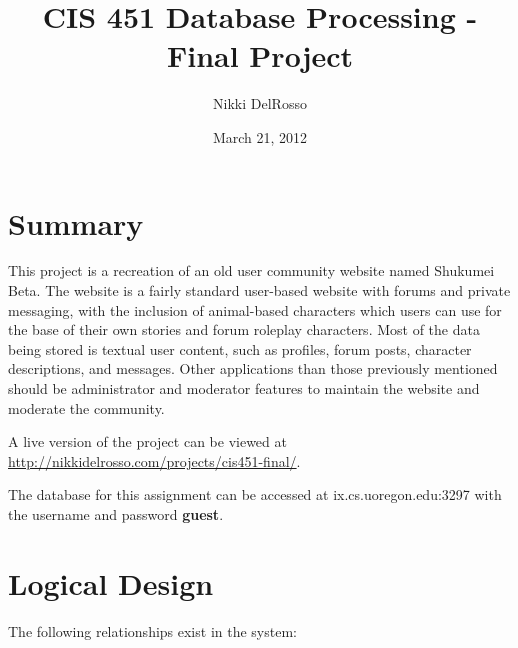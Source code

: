 \documentclass{book}
\begin{document}
\title{CIS 451 Database Processing - Final Project}
\author{Nikki DelRosso}
\date{March 21, 2012}
\maketitle
\thispagestyle{empty}
\let\cleardoublepage\clearpage

\tableofcontents
\newpage

\section{Summary}

This project is a recreation of an old user community website named Shukumei Beta.  The website is a fairly standard user-based website with forums and private messaging, with the inclusion of animal-based characters which users can use for the base of their own stories and forum roleplay characters.  Most of the data being stored is textual user content, such as profiles, forum posts, character descriptions, and messages.  Other applications than those previously mentioned should be administrator and moderator features to maintain the website and moderate the community.

A live version of the project can be viewed at \url{http://nikkidelrosso.com/projects/cis451-final/}.

The database for this assignment can be accessed at ix.cs.uoregon.edu:3297 with the username and password {\bf guest}.

\section{Logical Design}

The following relationships exist in the system:
\end{document}
